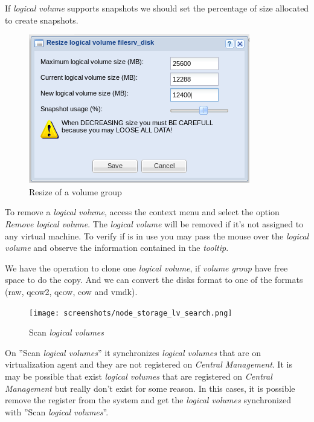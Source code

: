 If \emph{logical volume} supports snapshots we should set the percentage of size allocated to create snapshots.


\begin{figure}[H]
        \begin{center}
        \includegraphics[scale=0.5]{screenshots/storage_lv_resize.png}
        \caption{Resize of a volume group}
        \label{fig:storage_lv_resize}
        \end{center}
\end{figure}

To remove a \emph{logical volume}, access the context menu and select the option \emph{Remove logical volume}. The \emph{logical volume} will be removed if it's not assigned to any virtual machine. To verify if is in use you may pass the mouse over the \emph{logical volume} and observe the information contained in the \emph{tooltip}.

We have the operation to clone one \emph{logical volume}, if \emph{volume group} have free space to do the copy.
And we can convert the disks format to one of the formats (raw, qcow2, qcow, cow and vmdk).

\begin{figure}[H]
        \begin{center}
        \texttt{[image: screenshots/node\_storage\_lv\_search.png]}
        \caption{Scan \emph{logical volumes}}
        \label{fig:storage_lv_search}
        \end{center}
\end{figure}

On ''Scan \emph{logical volumes}'' it synchronizes \emph{logical volumes} that are on virtualization agent and they are not registered on \emph{Central Management}.
It is may be possible that exist \emph{logical volumes} that are registered on \emph{Central Management} but really don't exist for some reason.
In this cases, it is possible remove the register from the system and get the \emph{logical volumes} synchronized with ''Scan \emph{logical volumes}''.

